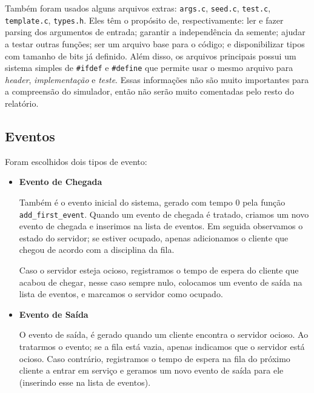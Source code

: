 \documentclass[a4paper]{article}
\newcommand{\arq}{\texttt}
\newcommand{\inlcode}{\texttt}
\begin{document}
Também foram usados alguns arquivos extras:
\arq{args.c}, \arq{seed.c},
\arq{test.c}, \arq{template.c}, \arq{types.h}.
Eles têm o propósito de, respectivamente:
ler e fazer parsing dos argumentos de entrada;
garantir a independência da semente;
ajudar a testar outras funções;
ser um arquivo base para o código; e
disponibilizar tipos com tamanho de bits já definido.
Além disso, os arquivos principais possui um sistema simples
de \inlcode{\#ifdef} e \inlcode{\#define}
que permite usar o mesmo arquivo para
\emph{header}, \emph{implementação} e \emph{teste}.
Essas informações não são muito importantes
para a compreensão do simulador,
então não serão muito comentadas pelo resto do relatório.

\subsection{Eventos}
Foram escolhidos dois tipos de evento:
\begin{itemize}
    \item \textbf{Evento de Chegada} \par
        Também é o evento inicial do sistema,
        gerado com tempo \(0\)
        pela função \inlcode{add\_first\_event}.
        Quando um evento de chegada é tratado,
        criamos um novo evento de chegada
        e inserimos na lista de eventos.
        Em seguida observamos o estado do servidor;
        se estiver ocupado, apenas
        adicionamos o cliente que chegou
        de acordo com a disciplina da fila.

        Caso o servidor esteja ocioso,
        registramos o tempo de espera
        do cliente que acabou de chegar,
        nesse caso sempre nulo,
        colocamos um evento de saída na lista de eventos,
        e marcamos o servidor como ocupado.

    \item \textbf{Evento de Saída} \par
        O evento de saída,
        é gerado quando um cliente encontra o servidor ocioso.
        Ao tratarmos o evento;
        se a fila está vazia,
        apenas indicamos que o servidor está ocioso.
        Caso contrário,
        registramos o tempo de espera na fila
        do próximo cliente a entrar em serviço
        e geramos um novo evento de saída para ele
        (inserindo esse na lista de eventos).
\end{itemize}
\end{document}
